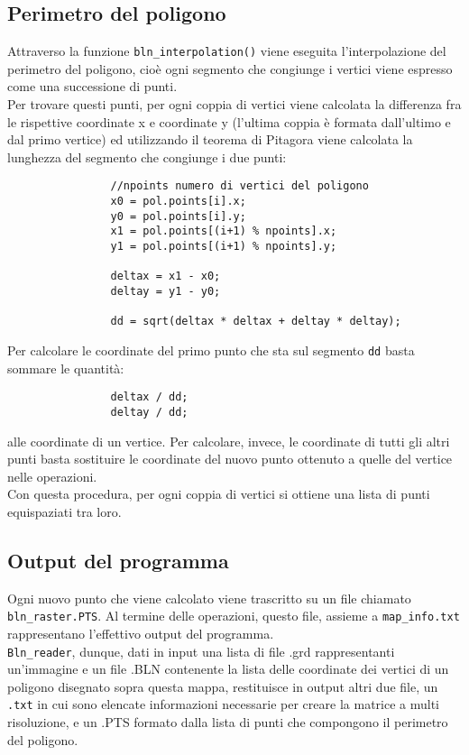 		\subsection{Perimetro del poligono}
			Attraverso la funzione \texttt{bln\_interpolation()} viene eseguita l'interpolazione del perimetro del poligono, cio\`{e} ogni segmento che congiunge i vertici viene espresso come una successione di punti.\\
			Per trovare questi punti, per ogni coppia di vertici viene calcolata la differenza fra le rispettive coordinate x e coordinate y (l'ultima coppia \`{e} formata dall'ultimo e dal primo vertice) ed utilizzando il teorema di Pitagora viene calcolata la lunghezza del segmento che congiunge i due punti:
			\begin{verbatim}
				//npoints numero di vertici del poligono
				x0 = pol.points[i].x;
				y0 = pol.points[i].y;
				x1 = pol.points[(i+1) % npoints].x;
				y1 = pol.points[(i+1) % npoints].y;
				
				deltax = x1 - x0;
				deltay = y1 - y0;

				dd = sqrt(deltax * deltax + deltay * deltay);
			\end{verbatim}
			Per calcolare le coordinate del primo punto che sta sul segmento \texttt{dd} basta sommare le quantit\`{a}:
			\begin{verbatim}
				deltax / dd;
				deltay / dd;
			\end{verbatim} 
			alle coordinate di un vertice. Per calcolare, invece, le coordinate di tutti gli altri punti basta sostituire le coordinate del nuovo punto ottenuto a quelle del vertice nelle operazioni.\\ 
			Con questa procedura, per ogni coppia di vertici si ottiene una lista di punti equispaziati tra loro.

		\subsection{Output del programma}
			Ogni nuovo punto che viene calcolato viene trascritto su un file chiamato \texttt{bln\_raster.PTS}.
			Al termine delle operazioni, questo file, assieme a \texttt{map\_info.txt} rappresentano l'effettivo output del programma. \\
			\texttt{Bln\_reader}, dunque, dati in input una lista di file .grd rappresentanti un'immagine e un file .BLN contenente la lista delle coordinate dei vertici di un poligono disegnato sopra questa mappa, restituisce in output altri due file, un \texttt{.txt} in cui sono elencate informazioni necessarie per creare la matrice a multi risoluzione, e un .PTS formato dalla lista di punti che compongono il perimetro del poligono.

